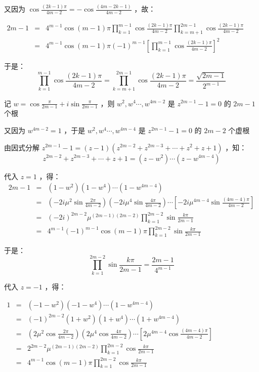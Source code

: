 又因为 $\displaystyle{\cos\frac{(2k-1)\pi}{4m-2}=-\cos\frac{(4m-2k-1)}{4m-2}}$ ，故：

$\begin{eqnarray*} 2m-1&=&4^{m-1}\cos(m-1)\pi\prod_{k=1}^{m-1}\cos{\frac{(2k-1)\pi}{4m-2}}\prod_{k=m+1}^{2m-1}\cos{\frac{(2k-1)\pi}{4m-2}}\\ &=&4^{m-1}\cos(m-1)\pi(-1)^{m-1}\left[\prod_{k=1}^{m-1}\cos{\frac{(2k-1)\pi}{4m-2}}\right]^2 \end{eqnarray*}$

于是：\begin{equation}
\prod_{k=1}^{m-1}\cos{\frac{(2k-1)\pi}{4m-2}}=\prod_{k=m+1}^{2m-1}\cos{\frac{(2k-1)\pi}{4m-2}}=\frac{\sqrt{2m-1}}{2^{m-1}}\tag{1}\end{equation}

记 $\displaystyle{w=\cos\frac{\pi}{2m-1}+i\sin\frac{\pi}{2m-1}}$ ，则 $w^2,w^4\cdots,w^{4m-2}$ 是 $z^{2m-1}-1=0$ 的 $2m-1$ 个根

又因为 $w^{4m-2}=1$ ，于是 $w^2,w^4\cdots ,w^{4m-4}$ 是 $z^{2m-1}-1=0$ 的 $2m-2$ 个虚根

由因式分解 $\displaystyle{z^{2m-1}-1=(z-1)(z^{2m-2}+z^{2m-3}+\cdots+z^{2}+z+1)}$ ，知：
$$z^{2m-2}+z^{2m-3}+\cdots+z+1=(z-w^2)\cdots(z-w^{4m-4})$$

代入 $z=1$ ，得：
$$\begin{eqnarray*} 2m-1&=&(1-w^2)(1-w^4)\cdots(1-w^{4m-4})\\ &=&\left(-2i\mu^2\sin\frac{2\pi}{4m-2}\right)\left(-2i\mu^4\sin\frac{4\pi}{4m-2}\right)\cdots\left[-2i\mu^{4m-4}\sin\frac{(4m-4)\pi}{4m-2}\right]\\ &=&(-2i)^{2m-2}\mu^{(2m-1)(2m-2)}\prod_{k=1}^{2m-2}\sin\frac{k\pi}{2m-1}\\ &=&4^{m-1}(-1)^{m-1}\cos(m-1)\pi\prod_{k=1}^{2m-2}\sin\frac{k\pi}{2m-1} \end{eqnarray*} $$

于是： 
\begin{equation}
\prod_{k=1}^{2m-2}\sin\frac{k\pi}{2m-1}=\frac{2m-1}{4^{m-1}}\tag{9} 
\end{equation}

代入 $z=-1$ ，得：

$\begin{eqnarray*} 1&=&(-1-w^2)(-1-w^4)\cdots(1-w^{4m-4})\\ &=&(-1)^{2m-2}(1+w^2)(1+w^4)\cdots(1+w^{4m-4})\\ &=&\left(2\mu^2\cos\frac{2\pi}{4m-2}\right)\left(2\mu^4\cos\frac{4\pi}{4m-2}\right)\cdots\left[2\mu^{4m-4}\cos\frac{(4m-4)\pi}{4m-2}\right]\\ &=&2^{2m-2}\mu^{(2m-1)(2m-2)}\prod_{k=1}^{2m-2}\cos\frac{k\pi}{2m-1}\\ &=&4^{m-1}\cos(m-1)\pi\prod_{k=1}^{2m-2}\cos\frac{k\pi}{2m-1} \end{eqnarray*}$ 

